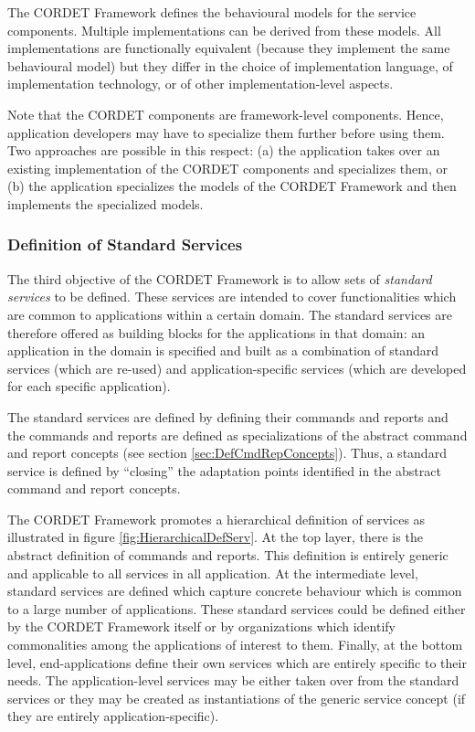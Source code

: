 \documentclass{pnp_article}
\begin{document}
The CORDET Framework defines the behavioural models for the service components. 
Multiple implementations can be derived from these models. 
All implementations are functionally equivalent (because they implement the same behavioural model) but they differ in the choice of implementation language, of implementation technology, or of other implementation-level aspects. 

Note that the CORDET components are framework-level components. 
Hence, application developers may have to specialize them further before using them. 
Two approaches are possible in this respect: (a) the application takes over an existing implementation of the CORDET components and specializes them, or (b) the application specializes the models of the CORDET Framework and then implements the specialized models.

\subsubsection{Definition of Standard Services}\label{sec:StdServ}
The third objective of the CORDET Framework is to allow sets of \textit{standard services} to be defined. 
These services are intended to cover functionalities which are common to applications within a certain domain. 
The standard services are therefore offered as building blocks for the applications in that domain: 
an application in the domain is specified and built as a combination of standard services (which are re-used) and application-specific services (which are developed for each specific application).

The standard services are defined by defining their commands and reports and the commands and reports are defined as specializations of the abstract command and report concepts (see section \ref{sec:DefCmdRepConcepts}). 
Thus, a standard service is defined by “closing” the adaptation points identified in the abstract command and report concepts.

The CORDET Framework promotes a hierarchical definition of services as illustrated in figure \ref{fig:HierarchicalDefServ}. 
At the top layer, there is the abstract definition of commands and reports. 
This definition is entirely generic and applicable to all services in all application. 
At the intermediate level, standard services are defined which capture concrete behaviour which is common to a large number of applications. 
These standard services could be defined either by the CORDET Framework itself or by organizations which identify commonalities among the applications of interest to them. 
Finally, at the bottom level, end-applications define their own services which are entirely specific to their needs. 
The application-level services may be either taken over from the standard services or they may be created as instantiations of the generic service concept (if they are entirely application-specific).
\end{document}
